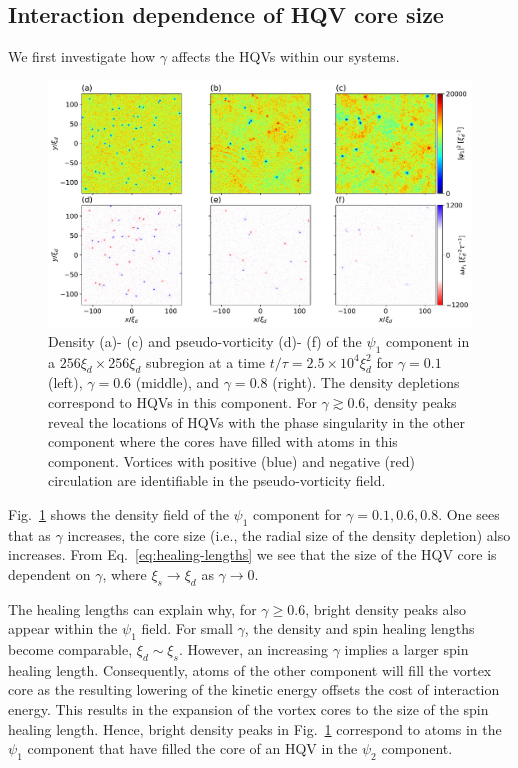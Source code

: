 \subsection{Interaction dependence of HQV core size}
We first investigate how \(\gamma \) affects the HQVs within our systems.
\begin{figure}
    \centering
    \includegraphics[width=\textwidth]{gfx/ch-twoCompDynamics/densVort.pdf}
    \caption{Density (a)- (c) and pseudo-vorticity (d)- (f) of the \(\psi_1 \)
    component in a \(256\xi_d \times 256\xi_d\) subregion at a time 
    \(t/\tau=2.5\times 10^4\xi_d^2\) for \(\gamma=0.1\) (left),
    \(\gamma=0.6\) (middle), and \(\gamma=0.8\) (right).
    The density depletions correspond to HQVs in this component.
    For \(\gamma \gtrsim 0.6\), density peaks reveal the locations of HQVs with
    the phase singularity in the other component where the cores have filled
    with atoms in this component.
    Vortices with positive (blue) and negative (red) circulation are
    identifiable in the pseudo-vorticity field.\label{fig:density-pseudo-vort}}
\end{figure}
Fig.~\ref{fig:density-pseudo-vort} shows the density field of the \(\psi_1 \)
component for \(\gamma = 0.1, 0.6, 0.8\).
One sees that as \(\gamma \) increases, the core size (i.e., the radial size of
the density depletion) also increases.
From Eq.~\eqref{eq:healing-lengths} we see that the size of the HQV core is
dependent on \(\gamma \), where \(\xi_s \rightarrow \xi_d\) as
\(\gamma \rightarrow 0\).

The healing lengths can explain why, for \(\gamma \geq 0.6\), bright density
peaks also appear within the \(\psi_1 \) field.
For small \(\gamma \), the density and spin healing lengths become comparable,
\(\xi_d \sim \xi_s\).
However, an increasing \(\gamma \) implies a larger spin healing length.
Consequently, atoms of the other component will fill the vortex core as the
resulting lowering of the kinetic energy offsets the cost of interaction energy.
This results in the expansion of the vortex cores to the size of the spin
healing length.
Hence, bright density peaks in Fig.~\ref{fig:density-pseudo-vort} correspond to
atoms in the \(\psi_1 \) component that have filled the core of an HQV in the
\(\psi_2\) component.

